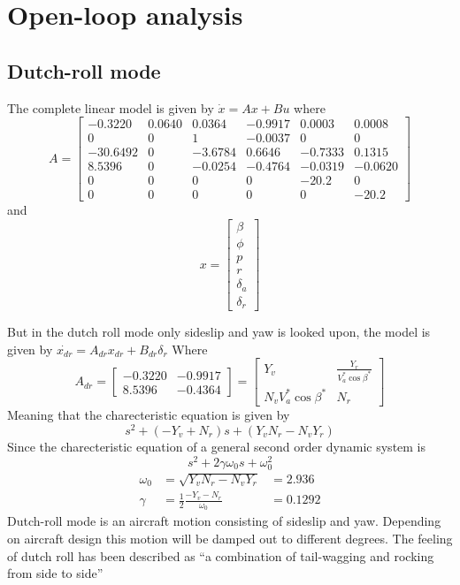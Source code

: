 \documentclass[11pt]{article}
\author{Kjetil Kjeka}
\title{}
\date{\today}
\begin{document}
\section{Open-loop analysis}
\subsection{Dutch-roll mode}
The complete linear model is given by $\dot{x} = A x + B u$ where \[A = \begin{bmatrix}
-0.3220 & 0.0640 & 0.0364 & -0.9917 & 0.0003 & 0.0008 \\
0 & 0 & 1 & -0.0037 & 0 & 0 \\
-30.6492 & 0 & -3.6784 & 0.6646 & -0.7333 & 0.1315 \\
8.5396 & 0& -0.0254 & -0.4764 & -0.0319 & -0.0620 \\
0 & 0 & 0 & 0 & -20.2 & 0 \\
0 & 0 & 0 & 0 & 0 & -20.2
\end{bmatrix} \]
and
\[x = \begin{bmatrix}
\beta \\
\phi \\
p \\
r \\
\delta_a \\
\delta_r 
\end{bmatrix} \]

But in the dutch roll mode only sideslip and yaw is looked upon, the model is given by $\dot{x_{dr}} = A_{dr} x_{dr} + B_{dr} \delta_r $ Where 
\[ A_{dr} = \begin{bmatrix}
-0.3220 & -0.9917 \\
8.5396 & -0.4364
\end{bmatrix} = \begin{bmatrix}
Y_v & \frac{Y_r}{V_a^* \cos{\beta^*}} \\
N_v V_a^* \cos{\beta^*} & N_r
\end{bmatrix} \]
Meaning that the charecteristic equation is given by
\[ s^2 + (-Y_v + N_r)s + (Y_v N_r - N_v Y_r) \]
Since the charecteristic equation of a general second order dynamic system is
\[s^2 + 2 \gamma \omega_0 s + \omega_0^2\]
\begin{align*}
\omega_0 &= \sqrt{Y_v N_r - N_v Y_r} &= 2.936 \\
\gamma &= \frac{1}{2} \frac{-Y_v - N_r}{\omega_0} &= 0.1292
\end{align*}
Dutch-roll mode is an aircraft motion consisting of sideslip and yaw. Depending on aircraft design this motion will be damped out to different degrees. The feeling of dutch roll has been described as ``a combination of tail-wagging and rocking from side to side''
\end{document}

